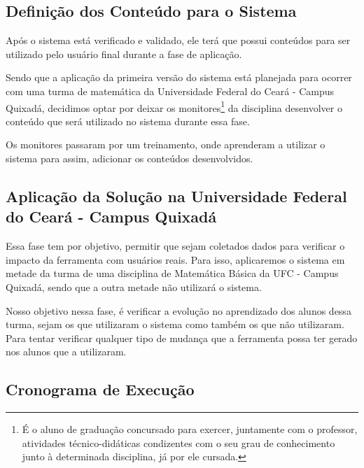 \subsection{Definição dos Conteúdo para o Sistema}

Após o sistema está verificado e validado, ele terá que possui conteúdos para ser utilizado pelo usuário final durante a fase de aplicação. 

Sendo que a aplicação da primeira versão do sistema está planejada para ocorrer com uma turma de matemática da Universidade Federal do Ceará - Campus Quixadá, decidimos optar por deixar os monitores\footnote{É o aluno de graduação concursado para exercer, juntamente com o professor, atividades técnico-didáticas condizentes com o seu grau de conhecimento junto à determinada disciplina, já por ele cursada.} da disciplina desenvolver o conteúdo que será utilizado no sistema durante essa fase. 

Os monitores passaram por um treinamento, onde aprenderam a utilizar o sistema para assim, adicionar os conteúdos desenvolvidos.

\subsection{Aplicação da Solução na Universidade Federal do Ceará - Campus Quixadá}

Essa fase tem por objetivo, permitir que sejam coletados dados para verificar o impacto da ferramenta com usuários reais. Para isso, aplicaremos o sistema em metade da turma de uma disciplina de Matemática Básica da UFC - Campus Quixadá, sendo que a outra metade não utilizará o sistema.

Nosso objetivo nessa fase, é verificar a evolução no aprendizado dos alunos dessa turma, sejam os que utilizaram o sistema como também os que não utilizaram. Para tentar verificar qualquer tipo de mudança que a ferramenta possa ter gerado nos alunos que a utilizaram.  

\subsection{Cronograma de Execução}

